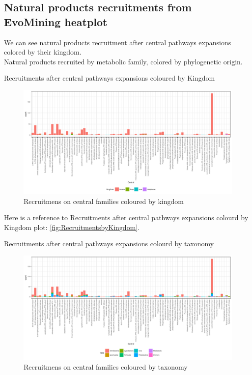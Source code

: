 \documentclass[12pt,twoside]{reedthesis}
\begin{document}
  \subsection{Natural products recruitments from EvoMining
  heatplot}\label{natural-products-recruitments-from-evomining-heatplot-2}
  
  We can see natural products recruitment after central pathways
  expansions colored by their kingdom.\\
  Natural products recruited by metabolic family, colored by phylogenetic
  origin.
  
  Recruitments after central pathways expansions coloured by Kingdom
  
  \begin{figure}[h!tbp]
  \centering
  \includegraphics[angle = 0,scale = 0.6]{chapter2/Cyanobacteria/RecruitmentsbyKingdom.pdf}
  \caption[Recruitmens on central families coloured by kingdom]{\normalsize{Recruitmens on central families coloured by kingdom}}
  \label{fig:RecruitmentsbyKingdom}
  \end{figure}
  
  Here is a reference to Recruitments after central pathways expansions
  colourd by Kingdom plot: \autoref{fig:RecruitmentsbyKingdom}.
  
  \clearpage  Recruitments after central pathways expansions colourd by
  taxonomy
  
  \begin{figure}[h!tbp]
  \centering
  \includegraphics[angle = 0,scale = 0.5]{chapter2/Cyanobacteria/RecruitmentsbyTaxa.pdf}
  \caption[Recruitmens on central families coloured by taxonomy]{\normalsize{Recruitmens on central families coloured by taxonomy}}
  \label{fig:RecruitmentsbyTaxa}
  \end{figure}
  
\end{document}
